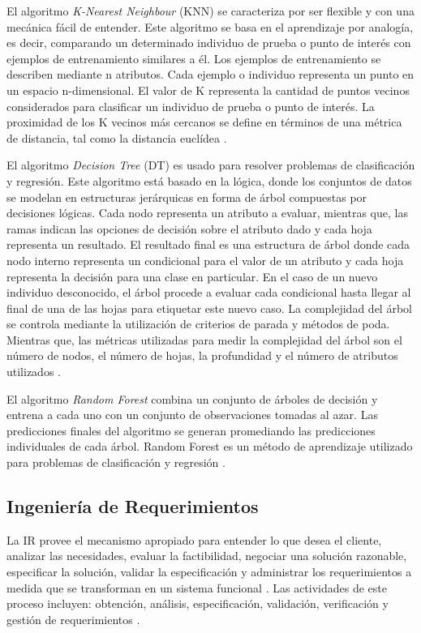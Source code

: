 \documentclass[journal]{IEEEtran}
\begin{document}
El algoritmo \textit{K-Nearest Neighbour} (KNN) se caracteriza por ser flexible y con una mecánica fácil de entender. Este algoritmo se basa en el aprendizaje por analogía, es decir, comparando un determinado individuo de prueba o punto de interés con ejemplos de entrenamiento similares a él. Los ejemplos de entrenamiento se describen mediante n atributos. Cada ejemplo o individuo representa un punto en un espacio n-dimensional. El valor de K representa la cantidad de puntos vecinos considerados para clasificar un individuo de prueba o  punto de interés. La proximidad de los K vecinos más cercanos se define en términos de una métrica de distancia, tal como la distancia euclídea \cite{alpaydin2014introduction}.  

El algoritmo \textit{Decision Tree} (DT) es usado para resolver problemas de clasificación y regresión. Este algoritmo está basado en la lógica, donde los conjuntos de datos se modelan en estructuras jerárquicas en forma de árbol compuestas por decisiones lógicas. Cada nodo representa un atributo a evaluar, mientras que, las ramas indican las opciones de decisión sobre el atributo dado y cada hoja representa un resultado. El resultado final es una estructura de árbol donde cada nodo interno representa un condicional para el valor de un atributo y cada hoja representa la decisión para una clase en particular. En el caso de un nuevo individuo desconocido, el árbol procede a evaluar cada condicional hasta llegar al final de una de las hojas para etiquetar este nuevo caso. La complejidad del árbol se controla mediante la utilización de criterios de parada y métodos de  poda. Mientras que, las métricas utilizadas para medir la complejidad del árbol son el número de nodos, el número de hojas, la profundidad y el número de atributos utilizados \cite{rokach2005decision}. 

El algoritmo \textit{Random Forest} combina un conjunto de árboles de decisión y entrena a cada uno con un conjunto de observaciones tomadas al azar. Las predicciones finales del algoritmo se generan promediando las predicciones individuales de cada árbol.  Random Forest es un método de aprendizaje utilizado para problemas de clasificación y regresión \cite{williams2011random}. 

\subsection{Ingeniería de Requerimientos}

La IR provee el mecanismo apropiado para entender lo que desea el cliente, analizar las necesidades, evaluar la factibilidad, negociar una solución razonable, especificar la solución, validar la especificación y administrar los requerimientos a medida que se transforman en un sistema funcional \cite{thayer1997software}. Las actividades de este proceso incluyen: obtención, análisis, especificación, validación, verificación y gestión de requerimientos \cite{Pohl2010}.
\end{document}
